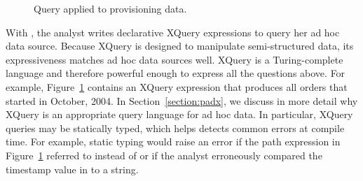 \begin{figure}
\begin{small}
\end{small}
\caption{Query applied to \dibbler{} provisioning data.}
\label{figure:dibbler-query}
\end{figure}

With \padx{}, the analyst
writes declarative XQuery expressions to query her ad hoc data source.
Because XQuery is designed to manipulate semi-structured data, its
expressiveness matches ad hoc data sources well.  XQuery is a
Turing-complete language and therefore powerful
enough to express all the questions above.  For example,
Figure~\ref{figure:dibbler-query} contains an XQuery expression that
produces all orders that started in October, 2004.  In
Section~\ref{section:padx}, we discuss in more detail why XQuery is an appropriate
query language for ad hoc data.  In particular, XQuery queries may be
statically typed, which helps detects common errors at compile time.
For example, static typing would raise an error if the path expression
in Figure~\ref{figure:dibbler-query} referred to  instead
of  or if the analyst erroneously compared the timestamp
value in  to a string.
